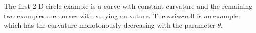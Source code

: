 \documentclass{article}
\theoremstyle{remark}
\newtheorem*{remark}{Remark}
\newtheorem{example}{Example}
\begin{document}
The first 2-D circle example is a curve with constant curvature and the remaining two examples are curves with varying curvature. The swiss-roll is an example which has the curvature monotonously decreasing with the parameter $\theta$. %
\end{document}
